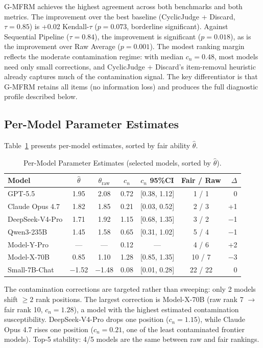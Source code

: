 \documentclass[11pt]{article}
\newcommand{\gmfrm}{G-MFRM}
\newcommand{\cn}{c_n}
\begin{document}
\gmfrm{} achieves the highest agreement across both benchmarks and both metrics.
The improvement over the best baseline (CyclicJudge + Discard, $\tau = 0.85$) is +0.02 Kendall-$\tau$ ($p = 0.073$, borderline significant).
Against Sequential Pipeline ($\tau = 0.84$), the improvement is significant ($p = 0.018$), as is the improvement over Raw Average ($p = 0.001$).
The modest ranking margin reflects the moderate contamination regime: with median $\cn = 0.48$, most models need only small corrections, and CyclicJudge + Discard's item-removal heuristic already captures much of the contamination signal.
The key differentiator is that \gmfrm{} retains all items (no information loss) and produces the full diagnostic profile described below.

\subsection{Per-Model Parameter Estimates}

Table~\ref{tab:per_model} presents per-model estimates, sorted by fair ability $\hat{\theta}$.

\begin{table}[t]
\centering
\caption{Per-Model Parameter Estimates (selected models, sorted by $\hat{\theta}$).}
\label{tab:per_model}
\small
\begin{tabular}{lcccccr}
\toprule
Model & $\hat{\theta}$ & $\theta_{\text{raw}}$ & $\cn$ & $\cn$ 95\%CI & Fair / Raw & $\Delta$ \\
\midrule
GPT-5.5 & 1.95 & 2.08 & 0.72 & [0.38, 1.12] & 1 / 1 & 0 \\
Claude Opus 4.7 & 1.82 & 1.85 & 0.21 & [0.03, 0.52] & 2 / 3 & +1 \\
DeepSeek-V4-Pro & 1.71 & 1.92 & 1.15 & [0.68, 1.35] & 3 / 2 & $-$1 \\
Qwen3-235B & 1.45 & 1.58 & 0.65 & [0.31, 1.02] & 5 / 4 & $-$1 \\
Model-Y-Pro & --- & --- & 0.12 & --- & 4 / 6 & +2 \\
Model-X-70B & 0.85 & 1.10 & 1.28 & [0.85, 1.35] & 10 / 7 & $-$3 \\
Small-7B-Chat & $-$1.52 & $-$1.48 & 0.08 & [0.01, 0.28] & 22 / 22 & 0 \\
\bottomrule
\end{tabular}
\end{table}

The contamination corrections are targeted rather than sweeping: only 2 models shift $\geq 2$ rank positions.
The largest correction is Model-X-70B (raw rank 7 $\to$ fair rank 10, $\cn = 1.28$), a model with the highest estimated contamination susceptibility.
DeepSeek-V4-Pro drops one position ($\cn = 1.15$), while Claude Opus 4.7 rises one position ($\cn = 0.21$, one of the least contaminated frontier models).
Top-5 stability: 4/5 models are the same between raw and fair rankings.
\end{document}
